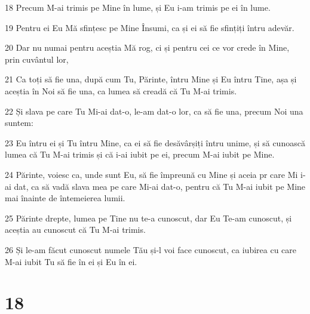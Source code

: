 \par 18 Precum M-ai trimis pe Mine în lume, și Eu i-am trimis pe ei în lume.
\par 19 Pentru ei Eu Mă sfințesc pe Mine Însumi, ca și ei să fie sfințiți întru adevăr.
\par 20 Dar nu numai pentru aceștia Mă rog, ci și pentru cei ce vor crede în Mine, prin cuvântul lor,
\par 21 Ca toți să fie una, după cum Tu, Părinte, întru Mine și Eu întru Tine, așa și aceștia în Noi să fie una, ca lumea să creadă că Tu M-ai trimis.
\par 22 Și slava pe care Tu Mi-ai dat-o, le-am dat-o lor, ca să fie una, precum Noi una suntem:
\par 23 Eu întru ei și Tu întru Mine, ca ei să fie desăvârșiți întru unime, și să cunoască lumea că Tu M-ai trimis și că i-ai iubit pe ei, precum M-ai iubit pe Mine.
\par 24 Părinte, voiesc ca, unde sunt Eu, să fie împreună cu Mine și aceia pr care Mi i-ai dat, ca să vadă slava mea pe care Mi-ai dat-o, pentru că Tu M-ai iubit pe Mine mai înainte de întemeierea lumii.
\par 25 Părinte drepte, lumea pe Tine nu te-a cunoscut, dar Eu Te-am cunoscut, și aceștia au cunoscut că Tu M-ai trimis.
\par 26 Și le-am făcut cunoscut numele Tău și-l voi face cunoscut, ca iubirea cu care M-ai iubit Tu să fie în ei și Eu în ei.

\chapter{18}

